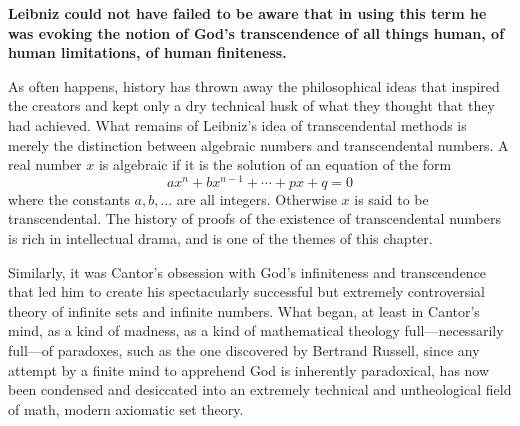 \documentclass[12pt]{book}
\begin{document}
\textbf{
Leibniz could not have failed to be aware that in using this term he was evoking
the notion of God's transcendence of all things human, of human limitations, of
human finiteness.
}
 
As often happens, history has thrown away the philosophical ideas that inspired
the creators and kept only a dry technical husk of what they thought that they had achieved.
What remains of Leibniz's idea of transcendental methods is merely the distinction between
algebraic numbers and transcendental numbers.
A real number $x$ is algebraic if it is the solution of an equation of the form
\[
   a x^n + b x^{n-1} + \cdots + p x + q = 0
\] 
where the constants $a, b, \ldots$ are all integers. Otherwise $x$ is said to be transcendental.
The history of proofs of the existence of transcendental numbers is rich in intellectual
drama, and is one of the themes of this chapter.
 
Similarly, it was Cantor's obsession with God's infiniteness and transcendence 
that led him to create his spectacularly successful 
but extremely controversial
theory of infinite sets and infinite numbers.
What began, at least in Cantor's mind, as a kind of madness, 
as a kind of mathematical theology full---necessarily full---of paradoxes, 
such as the one discovered by Bertrand Russell, 
since any attempt by a finite mind to apprehend God is inherently paradoxical,
has now been
condensed and desiccated into an extremely technical and untheological field of math,
modern axiomatic set theory.
 
\end{document}
